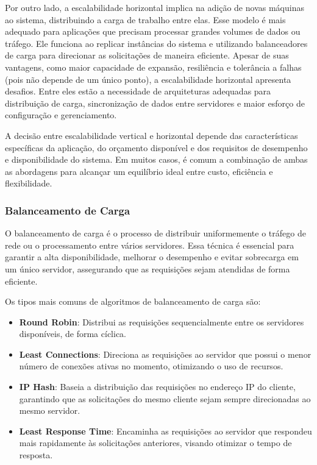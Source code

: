 Por outro lado, a escalabilidade horizontal implica na adição de novas máquinas ao sistema, distribuindo a carga de trabalho entre elas\cite{what-is-scalability}. Esse modelo é mais adequado para aplicações que precisam processar grandes volumes de dados ou tráfego. Ele funciona ao replicar instâncias do sistema e utilizando balanceadores de carga para direcionar as solicitações de maneira eficiente. Apesar de suas vantagens, como maior capacidade de expansão, resiliência e tolerância a falhas (pois não depende de um único ponto), a escalabilidade horizontal apresenta desafios. Entre eles estão a necessidade de arquiteturas adequadas para distribuição de carga, sincronização de dados entre servidores e maior esforço de configuração e gerenciamento.

A decisão entre escalabilidade vertical e horizontal depende das características específicas da aplicação, do orçamento disponível e dos requisitos de desempenho e disponibilidade do sistema. Em muitos casos, é comum a combinação de ambas as abordagens para alcançar um equilíbrio ideal entre custo, eficiência e flexibilidade.

\subsubsection{Balanceamento de Carga}


O balanceamento de carga é o processo de distribuir uniformemente o tráfego de rede ou o processamento entre vários servidores\cite{what-is-load-balancing}. Essa técnica é essencial para garantir a alta disponibilidade, melhorar o desempenho e evitar sobrecarga em um único servidor, assegurando que as requisições sejam atendidas de forma eficiente.

Os tipos mais comuns de algoritmos de balanceamento de carga são:

\begin{itemize}
    \item \textbf{Round Robin}: Distribui as requisições sequencialmente entre os servidores disponíveis, de forma cíclica.
    \item \textbf{Least Connections}: Direciona as requisições ao servidor que possui o menor número de conexões ativas no momento, otimizando o uso de recursos.
    \item \textbf{IP Hash}: Baseia a distribuição das requisições no endereço IP do cliente, garantindo que as solicitações do mesmo cliente sejam sempre direcionadas ao mesmo servidor.
    \item \textbf{Least Response Time}: Encaminha as requisições ao servidor que respondeu mais rapidamente às solicitações anteriores, visando otimizar o tempo de resposta.
\end{itemize}

